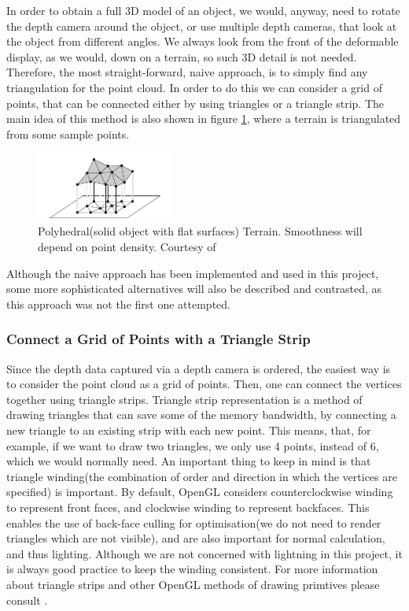 \documentclass[]{article}
\begin{document}
In order to obtain a full 3D model of an object, we would, anyway, need to rotate the depth camera around the object, or use multiple depth cameras, that look at the object from different angles. We always look from the front of the deformable display, as we would, down on a terrain, so such 3D detail is not needed. Therefore, the most straight-forward, naive approach, is to simply find any triangulation for the point cloud. In order to do this we can consider a grid of points, that can be connected either by using triangles or a triangle strip. The main idea of this method is also shown in figure \ref{fig:PolyhedralTerrain.PNG}, where a terrain is triangulated from some sample points.

\begin{figure}[hbtp]
    \centering
    \includegraphics[width=0.4\textwidth]{figures/PolyhedralTerrain.PNG}
    \caption{Polyhedral(solid object with flat surfaces) Terrain. Smoothness will depend on point density. Courtesy of \cite[Chapter~9]{berg08}}
    \label{fig:PolyhedralTerrain.PNG}
\end{figure}

Although the naive approach has been implemented and used in this project, some more sophisticated alternatives will also be described and contrasted, as this approach was not the first one attempted.

\subsubsection{Connect a Grid of Points with a Triangle Strip}
\label{sec:TriangleStripTriangulation}
Since the depth data captured via a depth camera is ordered, the easiest way is to consider the point cloud as a grid of points. Then, one can connect the vertices together using triangle strips. Triangle strip representation is a method of drawing triangles that can save some of the memory bandwidth, by connecting a new triangle to an existing strip with each new point. This means, that, for example, if we want to draw two triangles, we only use 4 points, instead of 6, which we would normally need. An important thing to keep in mind is that triangle winding(the combination of order and direction in which the vertices are specified) is important. By default, OpenGL considers counterclockwise winding to represent front faces, and clockwise winding to represent backfaces. This enables the use of back-face culling for optimisation(we do not need to render triangles which are not visible), and are also important for normal calculation, and thus lighting. Although we are not concerned with lightning in this project, it is always good practice to keep the winding consistent. For more information about triangle strips and other OpenGL methods of drawing primtives please consult \cite[Chapter~3]{superbible}.
\end{document}
